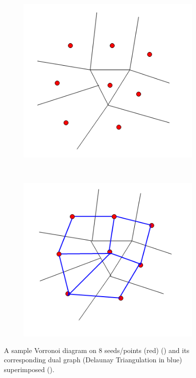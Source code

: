 \documentclass[10pt,a4paper]{article}
\theoremstyle{plain}
\theoremstyle{definition}
\begin{document}
      \begin{figure}[H]
      	\centering
      	\begin{subfigure}[b]{0.30\textwidth}
      		\includegraphics[width= \textwidth]{images/VoronoiDiagram.png}
      		\caption{}
      		\label{VoronnoiDiag}
      	\end{subfigure}~
      	\begin{subfigure}[b]{0.30\textwidth}
      		\includegraphics[width= \textwidth]{images/voronoiandDelanauy.png}
      		\caption{}
      		\label{VoronoiDelaunay}
      	\end{subfigure}
      	\caption{A sample Vorronoi diagram on $8$ seeds/points (red) () and its corresponding dual graph (Delaunay Triangulation in blue) superimposed ().}
       \end{figure}
  
\end{document}
